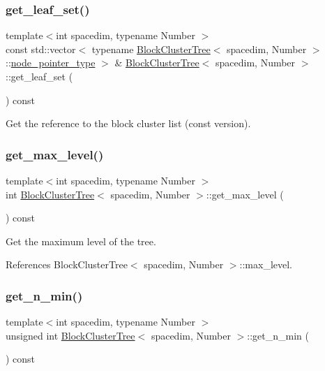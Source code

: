 \subsubsection{\texorpdfstring{get\+\_\+leaf\+\_\+set()}{get\_leaf\_set()}\hspace{0.1cm}{\footnotesize\ttfamily [2/2]}}
{\footnotesize\ttfamily template$<$int spacedim, typename Number $>$ \\
const std\+::vector$<$ typename \hyperlink{classBlockClusterTree}{Block\+Cluster\+Tree}$<$ spacedim, Number $>$\+::\hyperlink{classTreeNode}{node\+\_\+pointer\+\_\+type} $>$ \& \hyperlink{classBlockClusterTree}{Block\+Cluster\+Tree}$<$ spacedim, Number $>$\+::get\+\_\+leaf\+\_\+set (\begin{DoxyParamCaption}{ }\end{DoxyParamCaption}) const}

Get the reference to the block cluster list (const version). \mbox{\label{classBlockClusterTree_a404693ef7dfdbc383705c38105c75e14}} 
\subsubsection{\texorpdfstring{get\+\_\+max\+\_\+level()}{get\_max\_level()}}
{\footnotesize\ttfamily template$<$int spacedim, typename Number $>$ \\
int \hyperlink{classBlockClusterTree}{Block\+Cluster\+Tree}$<$ spacedim, Number $>$\+::get\+\_\+max\+\_\+level (\begin{DoxyParamCaption}{ }\end{DoxyParamCaption}) const}

Get the maximum level of the tree. 

References Block\+Cluster\+Tree$<$ spacedim, Number $>$\+::max\+\_\+level.

\mbox{\label{classBlockClusterTree_ab00acda5e8fd4c3e381637d8d9322923}} 
\subsubsection{\texorpdfstring{get\+\_\+n\+\_\+min()}{get\_n\_min()}}
{\footnotesize\ttfamily template$<$int spacedim, typename Number $>$ \\
unsigned int \hyperlink{classBlockClusterTree}{Block\+Cluster\+Tree}$<$ spacedim, Number $>$\+::get\+\_\+n\+\_\+min (\begin{DoxyParamCaption}{ }\end{DoxyParamCaption}) const}

